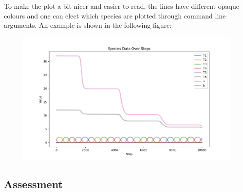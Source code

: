 To make the plot a bit nicer and easier to read, the lines have different opaque colours and one can elect which species are plotted through command line arguments. An example is shown in the following figure:
\begin{figure}[H]
    \centering
    \includegraphics[scale=0.4]{report/figures/examplePlot.png}
\end{figure}

\subsection{Assessment}